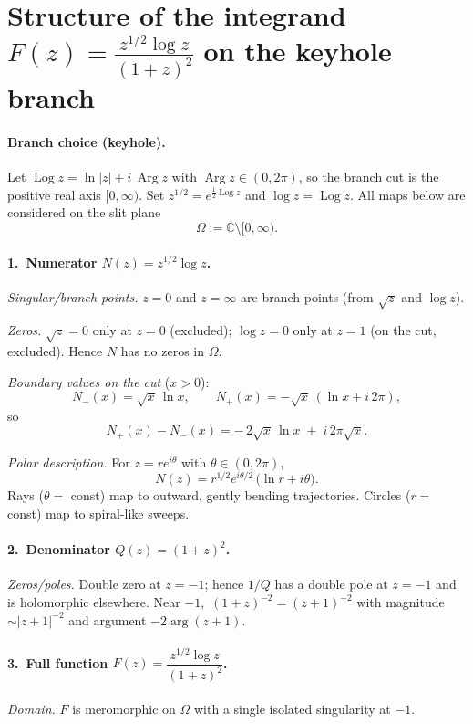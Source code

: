 \documentclass[12pt,a4paper]{article}
\DeclareMathOperator{\Arg}{Arg}
\DeclareMathOperator{\Log}{Log}
\newcommand{\C}{\mathbb{C}}
\begin{document}
\section*{Structure of the integrand \(\displaystyle F(z)=\frac{z^{1/2}\log z}{(1+z)^2}\) on the keyhole branch}

\paragraph{Branch choice (keyhole).}
Let \(\Log z=\ln|z|+i\,\Arg z\) with \(\Arg z\in(0,2\pi)\), so the branch cut is
the positive real axis \([0,\infty)\).
Set \(z^{1/2}=e^{\frac12\Log z}\) and \(\log z=\Log z\).
All maps below are considered on the slit plane
\[
\Omega:=\C\setminus[0,\infty).
\]

\bigskip

\paragraph{1.\ Numerator \(N(z)=z^{1/2}\log z\).}
\emph{Singular/branch points.}
\(z=0\) and \(z=\infty\) are branch points (from \(\sqrt z\) and \(\log z\)).

\emph{Zeros.}
\(\sqrt z=0\) only at \(z=0\) (excluded); \(\log z=0\) only at \(z=1\) (on the cut, excluded).
Hence \(N\) has no zeros in \(\Omega\).

\emph{Boundary values on the cut} (\(x>0\)):
\[
N_-(x)=\sqrt{x}\,\ln x,\qquad
N_+(x)=-\sqrt{x}\,(\ln x+i\,2\pi),
\]
so
\[
N_+(x)-N_-(x)=-\,2\sqrt{x}\,\ln x\;+\;i\,2\pi\sqrt{x}.
\]

\emph{Polar description.}
For \(z=re^{i\theta}\) with \(\theta\in(0,2\pi)\),
\[
N(z)=r^{1/2}e^{i\theta/2}\,\big(\ln r+i\theta\big).
\]
Rays (\(\theta=\) const) map to outward, gently bending trajectories.
Circles (\(r=\) const) map to spiral-like sweeps.

\bigskip

\paragraph{2.\ Denominator \(Q(z)=(1+z)^2\).}
\emph{Zeros/poles.}
Double zero at \(z=-1\); hence \(1/Q\) has a double pole at \(z=-1\) and is holomorphic elsewhere.
Near \(-1\),
\(\,(1+z)^{-2}=(z+1)^{-2}\) with magnitude \(\sim|z+1|^{-2}\) and argument \(-2\arg(z+1)\).

\bigskip

\paragraph{3.\ Full function \(F(z)=\dfrac{z^{1/2}\log z}{(1+z)^2}\).}
\emph{Domain.}
\(F\) is meromorphic on \(\Omega\) with a single isolated singularity at \(-1\).
\end{document}
